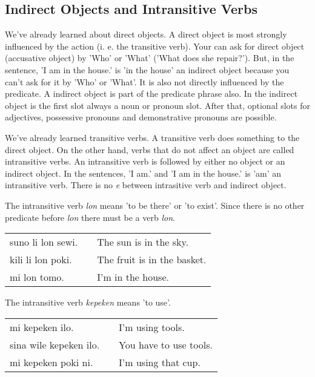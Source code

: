 \subsection*{Indirect Objects and Intransitive Verbs}
%
%
We've already learned about direct objects.
A direct object is most strongly influenced by the action (i. e. the transitive verb).
Your can ask for direct object (accusative object) by 'Who' or 'What' ('What does she repair?').
But, in the sentence, 'I am in the house.' is 'in the house' an indirect object because you can't ask for it by 'Who' or 'What'.
It is also not directly influenced by the predicate.
A indirect object is part of the predicate phrase also.
In the indirect object is the first slot always a noun or pronoun slot.
After that, optional slots for adjectives, possessive pronouns and demonstrative pronouns are possible.

We've already learned transitive verbs.
A transitive verb does something to the direct object.
On the other hand, verbs that do not affect an object are called intransitive verbs.
An intransitive verb is followed by either no object or an indirect object.
In the sentences, 'I am.' and 'I am in the house.' is 'am' an intransitive verb.
There is no \textit{e} between intrasitive verb and indirect object.

%
The intransitive verb \textit{lon} means 'to be there' or 'to exist'.
Since there is no other predicate before \textit{lon} there must be a verb \textit{lon}.

\begin{supertabular}{p{5,5cm}|ll}
    suno li lon sewi. &  & The sun is in the sky.      \\
    kili li lon poki. &  & The fruit is in the basket. \\
    mi lon tomo.      &  & I'm in the house.           \\
\end{supertabular}

%
The intransitive verb \textit{kepeken} means 'to use'.

\begin{supertabular}{p{5,5cm}|ll}
    mi kepeken ilo.        &  & I'm using tools.       \\
    sina wile kepeken ilo. &  & You have to use tools. \\
    mi kepeken poki ni.    &  & I'm using that cup.    \\
\end{supertabular}

